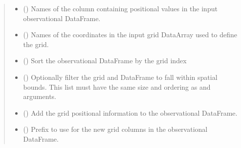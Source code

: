 \documentclass[letterpaper,10pt,english]{sphinxmanual}
\begin{document}
\begin{fulllineitems}
\begin{quote}
\begin{description}
\begin{itemize}
\item {}
\sphinxAtStartPar
{} (\sphinxstyleliteralemphasis{\sphinxupquote{{[}}}\sphinxstyleliteralemphasis{\sphinxupquote{{]}}}) \textendash{} Names of the column containing positional values in the input
observational DataFrame.

\item {}
\sphinxAtStartPar
{} (\sphinxstyleliteralemphasis{\sphinxupquote{{[}}}\sphinxstyleliteralemphasis{\sphinxupquote{{]}}}) \textendash{} Names of the coordinates in the input grid DataArray used to define the
grid.

\item {}
\sphinxAtStartPar
{} () \textendash{} Sort the observational DataFrame by the grid index

\item {}
\sphinxAtStartPar
{} (\sphinxstyleliteralemphasis{\sphinxupquote{{[}}}\sphinxstyleliteralemphasis{\sphinxupquote{{[}}}\sphinxstyleliteralemphasis{\sphinxupquote{, }}\sphinxstyleliteralemphasis{\sphinxupquote{{]}}}\sphinxstyleliteralemphasis{\sphinxupquote{{]} }}\sphinxstyleliteralemphasis{\sphinxupquote{| }}) \textendash{} Optionally filter the grid and DataFrame to fall within spatial bounds.
This list must have the same size and ordering as  and
 arguments.

\item {}
\sphinxAtStartPar
{} () \textendash{} Add the grid positional information to the observational DataFrame.

\item {}
\sphinxAtStartPar
{} () \textendash{} Prefix to use for the new grid columns in the observational DataFrame.


\end{itemize}
\end{description}
\end{quote}
\end{fulllineitems}
\end{document}
